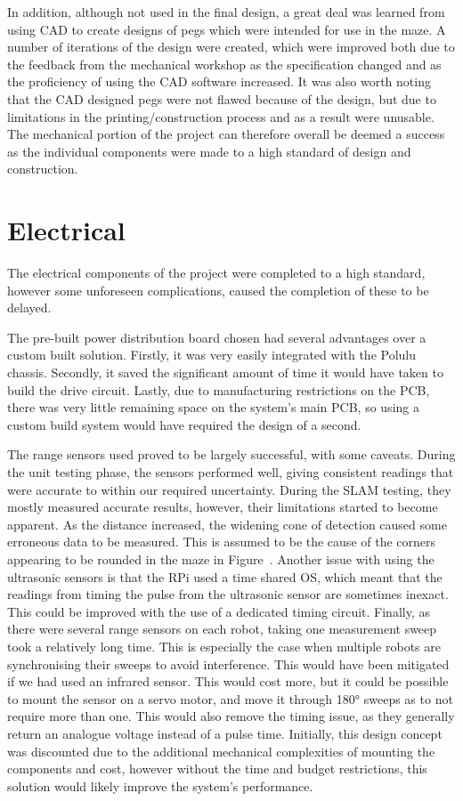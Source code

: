 In addition, although not used in the final design, a great deal was learned from 
using CAD to create designs of pegs which were intended for use in the maze. A number 
of iterations of the design were created, which were  improved  both due to the feedback from the mechanical workshop as the specification changed and as the proficiency of using the CAD software increased. It was also worth noting that the CAD designed pegs were not flawed
because of the design, but due to limitations in the printing/construction process and as a result were unusable. 
The mechanical portion of the project can therefore overall be deemed a success as 
the individual components were made to a high standard of design and construction. 

\section{Electrical}\label{eval/elec}
The electrical components of the project were completed to a high standard, 
however some unforeseen complications, caused the completion of these to be delayed.

The pre-built power distribution board chosen had several advantages over a 
custom built solution. Firstly, it was very easily integrated with the Polulu 
chassis. Secondly, it saved the significant amount of time it would have taken 
to build the drive circuit. Lastly, due to manufacturing restrictions on the PCB, 
there was very little remaining space on the system's main PCB, so using a custom 
build system would have required the design of a second. 

The range sensors used proved to be largely successful, with some caveats. 
During the unit testing phase, the sensors performed well, giving consistent 
readings that were accurate to within our required uncertainty. During the SLAM testing, 
they mostly measured accurate results, however, their limitations started to 
become apparent. As the distance increased, the widening cone of detection caused some 
erroneous data to be measured. This is assumed to be the cause of the corners 
appearing to be rounded in the maze in Figure~. 
Another issue with using the ultrasonic sensors is that the RPi used a time 
shared OS, which meant that the readings from timing the pulse from the 
ultrasonic sensor are sometimes inexact. This could be improved with the use of 
a dedicated timing circuit. Finally, as there were several range sensors on each 
robot, taking one measurement sweep took a relatively long time. This is 
especially the case when multiple robots are synchronising their sweeps to avoid 
interference. This would have been mitigated if we had used an infrared sensor. 
This would cost more, but it could be possible to mount the sensor on a servo 
motor, and move it through \ang{180} sweeps as to not require more than one. 
This would also remove the timing issue, as they generally return an analogue 
voltage instead of a pulse time. Initially, this design concept was discounted  due to the additional mechanical complexities of mounting the components and 
cost, however without the time and budget restrictions, this solution would 
likely improve the system's performance. 

